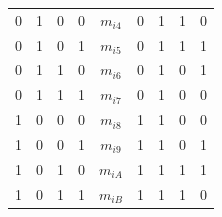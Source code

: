 \documentclass[a4paper]{article}
\begin{document}
\begin{table}[H]
\begin{tabular}{|c|c|c|c|c|c|c|c|c|}
0                                  & 1                                 & 0                                 & 0            & \textbf{$m_{i4}$} & 0                                   & 1                                   & 1                                   & 0                                   \\ \cline{5-5}
0                                  & 1                                 & 0                                 & 1            & \textbf{$m_{i5}$} & 0                                   & 1                                   & 1                                   & 1                                   \\ \cline{5-5}
0                                  & 1                                 & 1                                 & 0            & \textbf{$m_{i6}$} & 0                                   & 1                                   & 0                                   & 1                                   \\ \cline{5-5}
0                                  & 1                                 & 1                                 & 1            & \textbf{$m_{i7}$} & 0                                   & 1                                   & 0                                   & 0                                   \\ \cline{5-5}
1                                  & 0                                 & 0                                 & 0            & \textbf{$m_{i8}$} & 1                                   & 1                                   & 0                                   & 0                                   \\ \cline{5-5}
1                                  & 0                                 & 0                                 & 1            & \textbf{$m_{i9}$} & 1                                   & 1                                   & 0                                   & 1                                   \\ \cline{5-5}
1                                  & 0                                 & 1                                 & 0            & \textbf{$m_{iA}$} & 1                                   & 1                                   & 1                                   & 1                                   \\ \cline{5-5}
1                                  & 0                                 & 1                                 & 1            & \textbf{$m_{iB}$} & 1                                   & 1                                   & 1                                   & 0                                   \\ \cline{5-5}

\end{tabular}
\end{table}
\end{document}

